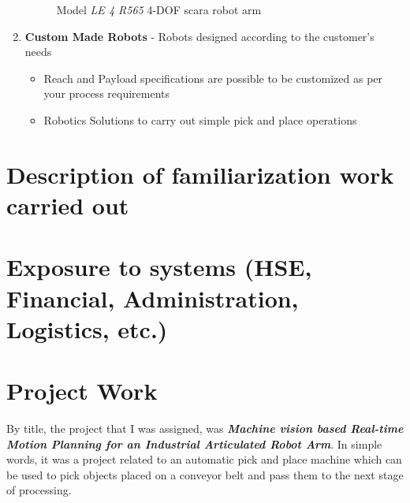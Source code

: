 \documentclass[a4paper,12pt]{report}%
\begin{document}
\begin{enumerate}
	\begin{figure}[H]
		\centering
		\caption{Model \textit{LE 4 R565} 4-DOF \ac{scara} robot arm\cite{scara_robots}}
		\label{fig:fourdofrobot}
	\end{figure}
	
	
	
	\item \textbf{Custom Made Robots} - Robots designed according to the customer's needs
	\begin{itemize}
		\item Reach and Payload specifications are possible to be customized as per your process requirements
		\item Robotics Solutions to carry out simple pick and place operations
	\end{itemize}
\end{enumerate}





\chapter{Description of familiarization work carried out}

\chapter{Exposure to systems (HSE, Financial, Administration, Logistics, etc.)}

\chapter{Project Work}

By title, the project that I was assigned, was \textbf{\textit{Machine vision based Real-time Motion Planning for an Industrial Articulated Robot Arm}}. In simple words, it was a project related to an automatic pick and place machine which can be used to pick objects placed on a conveyor belt and pass them to the next stage of processing.\\
\end{document}

